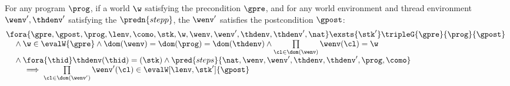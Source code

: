 \begin{theorem}
\label{def:soundness-prog}
For any program \( \prog \), if a world \( \w \) satisfying the precondition \( \gpre \), and for any world environment and thread environment \( \wenv', \thdenv' \) satisfying the \( \predn{stepp} \), the \( \wenv' \) satisfies the postcondition \( \gpost \):
\[
\begin{array}{@{}l}
\fora{\gpre, \gpost, \prog, \lenv, \como, \stk, \w, \wenv, \wenv', \thdenv, \thdenv', \nat}  \exsts{\stk'}
    \tripleG{\gpre}{\prog}{\gpost} \\
    \quad {} \land \w \in \evalW{\gpre}
    \land \dom(\wenv) = \dom(\prog) = \dom(\thdenv)
    \land \prod\limits_{\cl \in \dom(\wenv)} \wenv(\cl) = \w \\
    \quad {} \land \fora{\thid} \thdenv(\thid) = (\stk)
    \land \pred{steps}{\nat,\wenv, \wenv', \thdenv, \thdenv',\prog, \como}  \\
    \qquad {} \implies \prod\limits_{\cl \in \dom(\wenv')} \wenv'(\cl) \in \evalW[\lenv, \stk']{\gpost}
\end{array}
\] 
\end{theorem}
